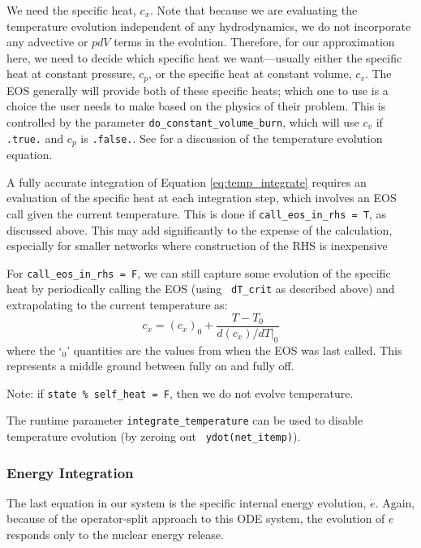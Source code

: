 We need the specific heat, $c_x$.  Note that because we are evaluating
the temperature evolution independent of any hydrodynamics, we do not
incorporate any advective or $pdV$ terms in the evolution.  Therefore,
for our approximation here, we need to decide which specific heat we
want---usually either the specific heat at constant pressure, $c_p$,
or the specific heat at constant volume, $c_v$.  The EOS generally
will provide both of these specific heats; which one to use is a
choice the user needs to make based on the physics of their problem.
This is controlled by the parameter {\tt do\_constant\_volume\_burn},
which will use $c_v$ if {\tt .true.}  and $c_p$ is {\tt .false.}.  See
\cite{maestro:III} for a discussion of the temperature evolution
equation.

A fully accurate integration of Equation \ref{eq:temp_integrate}
requires an evaluation of the specific heat at each integration step,
which involves an EOS call given the current temperature.  This is done
if {\tt call\_eos\_in\_rhs = T}, as discussed above.
This may add significantly to the expense of the calculation,
especially for smaller networks where construction of the RHS is
inexpensive

For {\tt call\_eos\_in\_rhs = F}, we can still capture some evolution
of the specific heat by periodically calling the EOS (using {\tt
  dT\_crit} as described above) and extrapolating to the current
temperature as:
\begin{equation}
  c_x = (c_x)_0 + \frac{T - T_0}{d(c_x)/dT|_0}
\end{equation}
where the `$_0$' quantities are the values from when the EOS was last
called.  This represents a middle ground between fully on and fully
off.

Note: if {\tt state \% self\_heat = F}, then we do not evolve
temperature.


The runtime parameter {\tt integrate\_temperature} can be used to
disable temperature evolution (by zeroing out {\tt
  ydot(net\_itemp)}). 


\subsubsection{Energy Integration}

The last equation in our system is the specific internal energy
evolution, $\dot{e}$.  Again, because of the operator-split approach
to this ODE system, the evolution of $e$ responds only to the nuclear
energy release.

